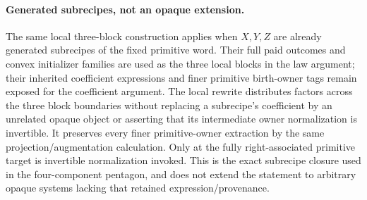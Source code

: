 \documentclass[11pt]{article}
\begin{document}
\paragraph{Generated subrecipes, not an opaque extension.} The same local three-block construction applies when $X,Y,Z$ are already generated subrecipes of the fixed primitive word. Their full paid outcomes and convex initializer families are used as the three local blocks in the law argument; their inherited coefficient expressions and finer primitive birth-owner tags remain exposed for the coefficient argument. The local rewrite distributes factors across the three block boundaries without replacing a subrecipe's coefficient by an unrelated opaque object or asserting that its intermediate owner normalization is invertible. It preserves every finer primitive-owner extraction by the same projection/augmentation calculation. Only at the fully right-associated primitive target is invertible normalization invoked. This is the exact subrecipe closure used in the four-component pentagon, and does not extend the statement to arbitrary opaque systems lacking that retained expression/provenance.
\end{document}
